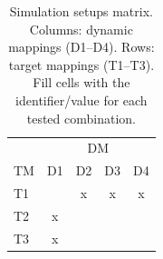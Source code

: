 \documentclass[preprint,12pt,authoryear]{elsarticle}
\begin{document}
\begin{table}[h]
  \centering
  \caption{Simulation setups matrix. Columns: dynamic mappings (D1--D4). Rows: target mappings (T1--T3). Fill cells with the identifier/value for each tested combination.}
  \label{tab:setups-matrix}
  \begin{tabular}{lcccc}
      \toprule
      & \multicolumn{4}{c}{DM} \\
      \cmidrule(lr){2-5}
      TM & D1 & D2 & D3 & D4 \\
      \midrule
      T1 &  & x & x & x \\
      T2 & x &  &  &  \\
      T3 & x &  &  &  \\
      \bottomrule
  \end{tabular}
\end{table}
\end{document}
